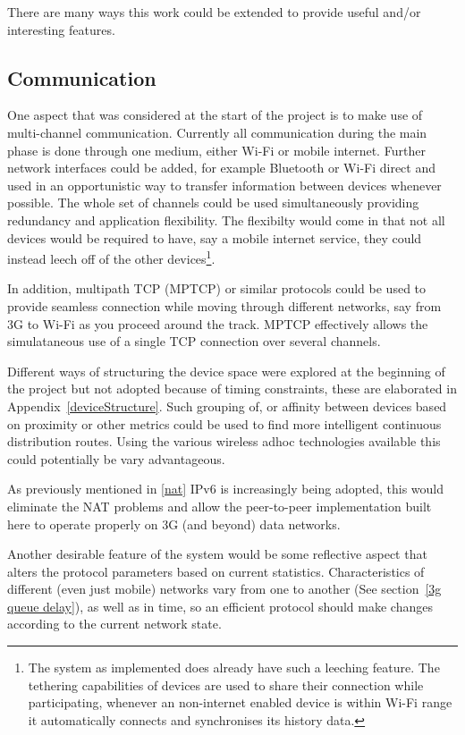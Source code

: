 There are many ways this work could be extended to provide useful and/or interesting features.

\subsection*{Communication}
One aspect that was considered at the start of the project is to make use of multi-channel communication. Currently all communication during the main phase is done through one medium, either Wi-Fi or mobile internet. Further network interfaces could be added, for example Bluetooth or Wi-Fi direct and used in an opportunistic way to transfer information between devices whenever possible. The whole set of channels could be used simultaneously providing redundancy and application flexibility. The flexibilty would come in that not all devices would be required to have, say a mobile internet service, they could instead leech off of the other devices\footnote{The system as implemented does already have such a leeching feature. The tethering capabilities of devices are used to share their connection while participating, whenever an non-internet enabled device is within Wi-Fi range it automatically connects and synchronises its history data.}.

In addition, multipath TCP (MPTCP) or similar protocols could be used to provide seamless connection while moving through different networks, say from 3G to Wi-Fi as you proceed around the track. MPTCP effectively allows the simulataneous use of a single TCP connection over several channels.

Different ways of structuring the device space were explored at the beginning of the project but not adopted because of timing constraints, these are elaborated in Appendix~\ref{deviceStructure}. Such grouping of, or affinity between devices based on proximity or other metrics could be used to find more intelligent continuous distribution routes. Using the various wireless adhoc technologies available this could potentially be vary advantageous.

As previously mentioned in \ref{nat} IPv6 is increasingly being adopted, this would eliminate the NAT problems and allow the peer-to-peer implementation built here to operate properly on 3G (and beyond) data networks.

Another desirable feature of the system would be some reflective aspect that alters the protocol parameters based on current statistics. Characteristics of different (even just mobile) networks vary from one to another (See section~\ref{3g queue delay}), as well as in time, so an efficient protocol should make changes according to the current network state.

